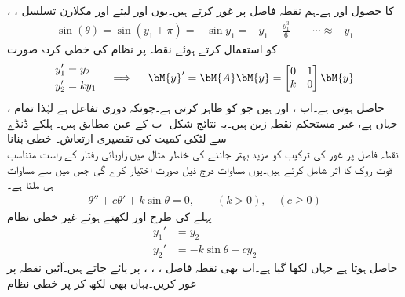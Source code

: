    ، ،   کا حصول  اور  ہے۔ہم نقطہ فاصل  پر غور کرتے ہیں۔یوں  اور  لیتے اور مکلارن تسلسل
\begin{align*}
\sin(\theta)=\sin(y_1+\pi)=-\sin y_1=-y_1+\frac{y_1^3}{6}+-\cdots \approx -y_1
\end{align*}
کو استعمال کرتے ہوئے  نقطہ  پر نظام  کی خطی کردہ صورت 
\begin{gather}
\begin{aligned}
y_1'&=y_2\\
y_2'&=ky_1
\end{aligned}\quad \implies \quad
\begin{aligned}
\bM{y}'=\bM{A}\bM{y}=\begin{bmatrix} 0&1\\ k&0 \end{bmatrix} \bM{y}
\end{aligned}
\end{gather}
حاصل ہوتی ہے۔اب ،  اور  ہیں جو  کو ظاہر کرتی ہے۔چونکہ  دوری تفاعل ہے لہٰذا تمام ،  جہاں  ہے، غیر مستحکم نقطہ زین ہیں۔یہ نتائج شکل -ب کے عین مطابق ہیں۔
\quad ہلکے ڈنڈے سے لٹکی کمیت کی تقصیری ارتعاش۔ خطی بنانا\\
نقطہ فاصل پر غور کی ترکیب کو مزید بہتر جاننے کی خاطر مثال  میں زاویائی رفتار کے راست متناسب قوت روک  کا اثر شامل کرتے ہیں۔یوں مساوات  درج ذیل صورت اختیار کرے گی جس میں  سے  مساوات  ہی ملتا ہے۔
\begin{align}\label{مساوات_نظام_غیر_خطی_ترکیب_تقصیری_الف}
\theta''+c\theta'+k\sin \theta=0, \quad \quad (k>0), \quad (c\ge 0)
\end{align}
پہلے کی طرح  اور  لکھتے ہوئے  غیر خطی نظام
\begin{align*}
y_1'&=y_2\\
y_2'&=-k\sin \theta-cy_2
\end{align*}
حاصل ہوتا ہے جہاں  لکھا گیا ہے۔اب بھی نقطہ فاصل ، ، ،   پر پائے جاتے ہیں۔آئیں نقطہ  پر غور کریں۔یہاں بھی  لکھ کر  پر خطی نظام
